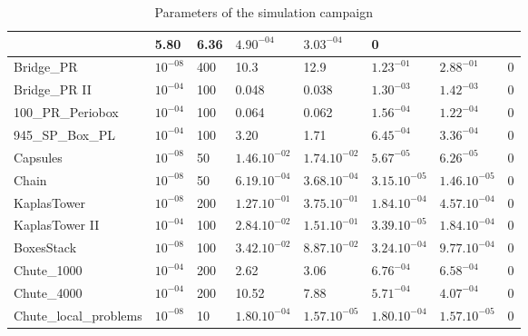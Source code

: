 \begin{table}
\begin{tabular}{|l|l|l|l|l|l|l|l|}
  & 5.80
  & 6.36
  & $4.90^{-04}$
  & $3.03^{-04}$
  & 0
  \\
  \hline
  Bridge\_PR
  & $10^{-08}$
  & 400
  & 10.3
  & 12.9
  & $1.23^{-01}$
  & $2.88^{-01}$
  & 0\\
  \hline
  Bridge\_PR II
  & $10^{-04}$
  & 100
  & 0.048
  & 0.038
  & $1.30^{-03}$
  & $1.42^{-03}$
  & 0\\
  \hline
  100\_PR\_Periobox
  & $10^{-04}$
  & 100
  & 0.064
  & 0.062
  & $1.56^{-04}$
  & $1.22^{-04}$
  & 0
  \\
  \hline
  945\_SP\_Box\_PL
  & $10^{-04}$
  & 100
  & 3.20
  & 1.71
  & $6.45^{-04}$
  & $3.36^{-04}$
  & 0
  \\
  \hline
  Capsules
  & $10^{-08}$
  & 50
  & $1.46.10^{-02}$
  & $1.74.10^{-02}$
  & $5.67^{-05}$
  & $6.26^{-05}$
  & 0
  \\
  \hline
  Chain
  & $10^{-08}$
  & 50
  & $6.19.10^{-04}$
  & $3.68.10^{-04}$
  & $3.15.10^{-05}$
  & $1.46.10^{-05}$
  & 0
  \\
  \hline
  KaplasTower
  & $10^{-08}$
  & 200
  & $1.27.10^{-01}$
  & $3.75.10^{-01}$
  & $1.84.10^{-04}$
  & $4.57.10^{-04}$
  & 0
  \\
  \hline
  KaplasTower II
  & $10^{-04}$
  & 100
  & $2.84.10^{-02}$
  & $1.51.10^{-01}$
  & $3.39.10^{-05}$
  & $1.84.10^{-04}$
  & 0
  \\
  \hline
  BoxesStack
  & $10^{-08}$
  & 100
  & $3.42.10^{-02}$
  & $8.87.10^{-02}$
  & $3.24.10^{-04}$
  & $9.77.10^{-04}$
  & 0
  \\
  \hline
  Chute\_1000
  & $10^{-04}$
  & 200
  & 2.62
  & 3.06
  & $6.76^{-04}$
  & $6.58^{-04}$
  & 0
  \\
  \hline
  Chute\_4000
  & $10^{-04}$
  & 200
  & 10.52
  & 7.88
  & $5.71^{-04}$
  & $4.07^{-04}$
  & 0
  \\
  \hline
  Chute\_local\_problems
  & $10^{-08}$
  & 10
  & $1.80.10^{-04}$
  & $1.57.10^{-05}$
  & $1.80.10^{-04}$
  & $1.57.10^{-05}$
  &  0 \\
  \hline
\end{tabular}
\caption{Parameters of the simulation campaign}
\label{Tab:fclib-simulation}
\end{table}

